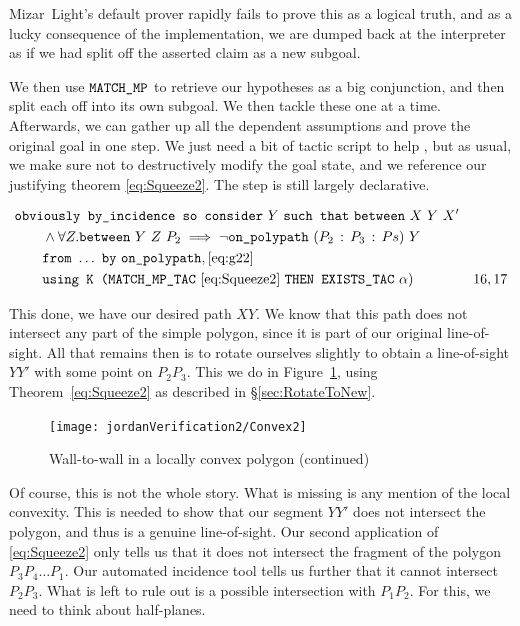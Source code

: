 Mizar~Light's default prover rapidly fails to prove this as a logical truth, and as a lucky consequence of the implementation, we are dumped back at the interpreter as if we had split off the asserted claim as a new subgoal. 

We then use $\texttt{MATCH\_MP}$ to retrieve our hypotheses as a big conjunction, and then split each off into its own subgoal. We then tackle these one at a time. Afterwards, we can gather up all the dependent assumptions and prove the original goal in one step. We just need a bit of tactic script to help , but as usual, we make sure not to destructively modify the goal state, and we reference our justifying theorem \eqref{eq:Squeeze2}. The step is still largely declarative.

\begin{align*}
\small
&\code{obviously by\_incidence so consider}\ Y\ \code{such that}\ \between{X}{Y}{X'}\\
&\qquad\wedge \forall Z. \between{Y}{Z}{P_2} \implies \neg\code{on\_polypath}\ (\cons{P_2}{\cons{P_3}{Ps}})\ Y\\ &\qquad\code{from}\ \ldots\ \code{by}\ \code{on\_polypath},\eqref{eq:g22}\\
&\qquad\code{using K (MATCH\_MP\_TAC}\ \eqref{eq:Squeeze2}\ \code{THEN EXISTS\_TAC}\ \alpha) & 16,17
\end{align*}

This done, we have our desired path $XY$. We know that this path does not intersect any part of the simple polygon, since it is part of our original line-of-sight. All that remains then is to rotate ourselves slightly to obtain a line-of-sight $YY'$ with some point on $P_2P_3$. This we do in Figure~\ref{fig:Convex2}, using Theorem~\ref{eq:Squeeze2} as described in \S\ref{sec:RotateToNew}. 

\begin{figure}
\centering\texttt{[image: jordanVerification2/Convex2]}
\caption{Wall-to-wall in a locally convex polygon (continued)}
\label{fig:Convex2}
\end{figure}

Of course, this is not the whole story. What is missing is any mention of the local convexity. This is needed to show that our segment $YY'$ does not intersect the polygon, and thus is a genuine line-of-sight. Our second application of \eqref{eq:Squeeze2} only tells us that it does not intersect the fragment of the polygon $P_3P_4\ldots P_1$. Our automated incidence tool tells us further that it cannot intersect $P_2P_3$. What is left to rule out is a possible intersection with $P_1P_2$. For this, we need to think about half-planes. 

